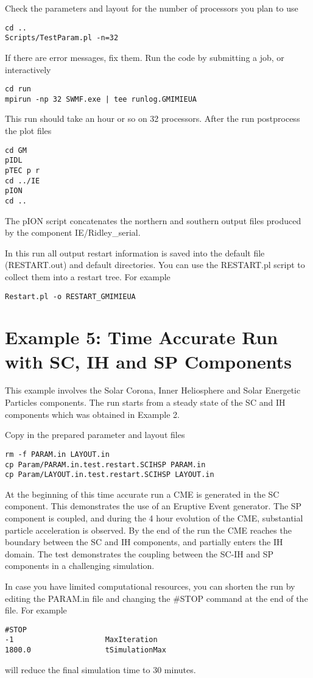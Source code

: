 Check the parameters and layout for the number of processors you plan to use
\begin{verbatim}
cd ..
Scripts/TestParam.pl -n=32
\end{verbatim}
If there are error messages, fix them. 
Run the code by submitting a job, or interactively
\begin{verbatim}
cd run
mpirun -np 32 SWMF.exe | tee runlog.GMIMIEUA
\end{verbatim}
This run should take an hour or so on 32 processors.
After the run postprocess the plot files
\begin{verbatim}
cd GM
pIDL
pTEC p r
cd ../IE
pION
cd ..
\end{verbatim}
The pION script concatenates the northern and southern output files
produced by the component IE/Ridley\_serial.

In this run all output restart information is saved into the
default file (RESTART.out) and default directories.
You can use the RESTART.pl script to collect them into a restart tree.
For example
\begin{verbatim}
Restart.pl -o RESTART_GMIMIEUA
\end{verbatim}

\section{Example 5: Time Accurate Run with SC, IH and SP Components}

This example involves the Solar Corona, Inner Heliosphere
and Solar Energetic Particles components.
The run starts from a steady state of the SC and IH components
which was obtained in Example 2.

Copy in the prepared parameter and layout files
\begin{verbatim}
rm -f PARAM.in LAYOUT.in
cp Param/PARAM.in.test.restart.SCIHSP PARAM.in
cp Param/LAYOUT.in.test.restart.SCIHSP LAYOUT.in
\end{verbatim}
At the beginning of this time accurate run a CME is 
generated in the SC component. This demonstrates the
use of an Eruptive Event generator.
The SP component is coupled, and during the 4 hour evolution
of the CME, substantial particle acceleration is observed. 
By the end of the run the CME reaches the boundary 
between the SC and IH components, and partially enters the IH domain.
The test demonstrates the coupling between the SC-IH and SP
components in a challenging simulation.

In case you have limited computational resources, you can 
shorten the run by editing the PARAM.in file and changing
the \#STOP command at the end of the file. For example 
\begin{verbatim}
#STOP
-1                     MaxIteration
1800.0                 tSimulationMax
\end{verbatim}
will reduce the final simulation time to 30 minutes.

